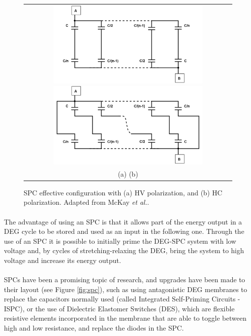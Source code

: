 \begin{figure}[ht]
\begin{center}
\begin{tabular}{c}
\includegraphics[height=4.2cm]{fig03/SPC_HV3.png}
\includegraphics[height=4.2cm]{fig03/SPC_HC3.png}\\
(a) \hspace{7cm} (b)
\end{tabular}
\end{center}
\caption 
{ \label{fig:spc_form}
SPC effective configuration with (a) HV polarization, and (b) HC polarization. Adapted from McKay \textit{et al.}\cite{SPCdesign}.} 
\end{figure} 

\paragraph{} The advantage of using an SPC is that it allows part of the energy output in a DEG cycle to be stored and used as an input in the following one. Through the use of an SPC it is possible to initially prime the DEG-SPC system with low voltage and, by cycles of stretching-relaxing the DEG, bring the system to high voltage and increase its energy output.

\paragraph{}SPCs have been a promising topic of research, and upgrades have been made to their layout (see Figure \ref{fig:spc}), such as using antagonistic DEG membranes to replace the capacitors normally used (called Integrated Self-Priming Circuits - ISPC)\cite{AntagSPC}, or the use of Dielectric Elastomer Switches (DES), which are flexible resistive  elements incorporated in the membrane that are able to toggle between high and low resistance, and replace the diodes in the SPC\cite{DESSPC}.

